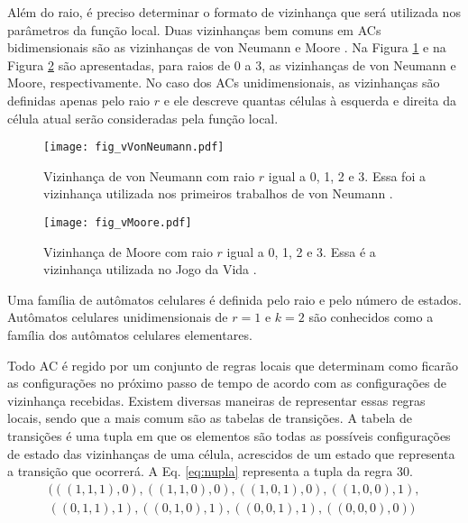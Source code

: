 Além do raio, é preciso determinar o formato de vizinhança que será utilizada nos parâmetros da função local. Duas vizinhanças bem comuns em ACs bidimensionais são as vizinhanças de von Neumann \cite{weisstein2015b} e Moore \cite{weisstein2015c}. Na Figura \ref{fig:vVonNeumann} e na Figura \ref{fig:vMoore} são apresentadas, para raios de 0 a 3, as vizinhanças de von Neumann e Moore, respectivamente. No caso dos ACs unidimensionais, as vizinhanças são definidas apenas pelo raio $r$ e ele descreve quantas células à esquerda e direita da célula atual serão consideradas pela função local.

	\begin{figure}[h!]
	  \centering
	  \texttt{[image: fig\_vVonNeumann.pdf]}
	  \caption{Vizinhança de von Neumann com raio $r$ igual a 0, 1, 2 e 3. Essa foi a vizinhança utilizada nos primeiros trabalhos de von Neumann \cite{weisstein2015b}.}
	  \label{fig:vVonNeumann}
	\end{figure}

	\begin{figure}[h!]
	  \centering
  	  \texttt{[image: fig\_vMoore.pdf]}
	  \caption{Vizinhança de Moore com raio $r$ igual a 0, 1, 2 e 3. Essa é a vizinhança utilizada no Jogo da Vida \cite{weisstein2015c}.}
	  \label{fig:vMoore}
	\end{figure}

Uma família de autômatos celulares é definida pelo raio e pelo número de estados. Autômatos celulares unidimensionais de $r=1$ e $k=2$ são conhecidos como a família dos autômatos celulares elementares.

Todo AC é regido por um conjunto de regras locais que determinam como ficarão as configurações no próximo passo de tempo de acordo com as configurações de vizinhança recebidas. Existem diversas maneiras de representar essas regras locais, sendo que a mais comum são as tabelas de transições. A tabela de transições é uma tupla em que os elementos são todas as possíveis configurações de estado das vizinhanças de uma célula, acrescidos de um estado que representa a transição que ocorrerá. A Eq. \eqref{eq:nupla} representa a tupla da regra 30.
	\begin{equation}
	\begin{split}
	(((1,1,1),0),((1,1,0),0),((1,0,1),0),((1,0,0),1),\\
	((0,1,1),1),((0,1,0),1),((0,0,1),1),((0,0,0),0))
	\label{eq:nupla}
	\end{split}
	\end{equation}

